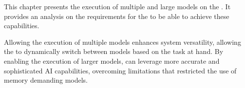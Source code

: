 This chapter presents the execution of multiple and large models on the \graicore{}.
It provides an analysis on the requirements for the \confignoc{} to be able to achieve these capabilities.

Allowing the execution of multiple models enhances system versatility, allowing the \graicore{} to dynamically switch between models based on the task at hand.
By enabling the execution of larger models, \graicore{} can leverage more accurate and sophisticated AI capabilities, overcoming limitations that restricted the use of memory demanding models.
